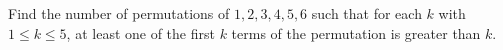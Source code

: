 Find the number of permutations of $1,2,3,4,5,6$ such that for each $k$ with $1\leq k\leq 5$, at least one of the first $k$ terms of the permutation is greater than $k$.
